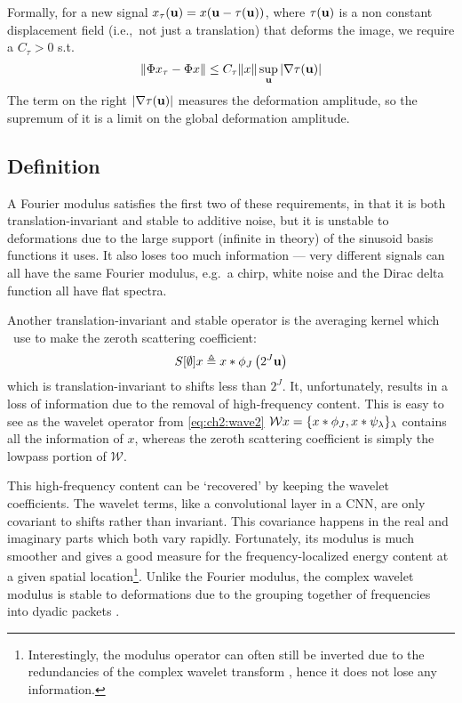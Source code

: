   Formally, for a new signal
  $x_{\tau}(\mathbf{u}) = x(\mathbf{u}-\tau(\mathbf{u}))$, where $\tau(\mathbf{u})$ is a non
  constant displacement field (i.e.,\ not just a translation) that deforms the
  image, we require a $C_\tau>0$ s.t.
  \protect\begin{equation}\label{eq:scat_deformation_stability}
    \|\Phi x_{\tau} - \Phi x \| \leq C_\tau \|x\| \sup_{\mathbf{u}} |\nabla\tau(\mathbf{u})|
  \protect\end{equation}
  The term on the right $|\nabla\tau(\mathbf{u})|$ measures the deformation
  amplitude, so the supremum of it is a limit on the global deformation amplitude.

\subsection{Definition}
  A Fourier modulus satisfies the first two of these requirements, in that it is
  both translation-invariant and stable to additive noise, but it is unstable to
  deformations due to the large support (infinite in theory) of the sinusoid basis functions it
  uses. It also loses too much information --- very different signals can all
  have the same Fourier modulus, e.g.\ a chirp, white noise and the Dirac delta
  function all have flat spectra.

  Another translation-invariant and stable operator is the averaging kernel
  which \Mallat\ use to make the zeroth scattering coefficient:
  \begin{equation}
    S[\emptyset]x \triangleq x \ast \phi_J\left(2^J \mathbf{u}\right)
  \end{equation}
  which is translation-invariant to shifts less than $2^J$. It, unfortunately,
  results in a loss of information due to the removal of high-frequency content.
  This is easy to see as the wavelet operator from \eqref{eq:ch2:wave2} $\mathcal{W}x = \{ x \ast
  \phi_J, x \ast \psi_\lambda \}_\lambda$ contains all the information of
  $x$, whereas the zeroth scattering coefficient is simply the lowpass portion
  of $\mathcal{W}$.

This high-frequency content can be `recovered' by keeping the wavelet
coefficients. The wavelet terms, like a convolutional layer in a CNN, are only
covariant to shifts rather than invariant. This covariance happens in the real
and imaginary parts which both vary rapidly. Fortunately, its modulus is much
smoother and gives a good measure for the frequency-localized energy content at
a given spatial location\footnote{Interestingly, the modulus operator can often still be
inverted due to the redundancies of the complex wavelet transform \cite{waldspurger_phase_2012},
hence it does not lose any information.}. Unlike
the Fourier modulus, the complex wavelet modulus is stable to deformations due
to the grouping together of frequencies into dyadic packets
\cite{mallat_group_2012}.

